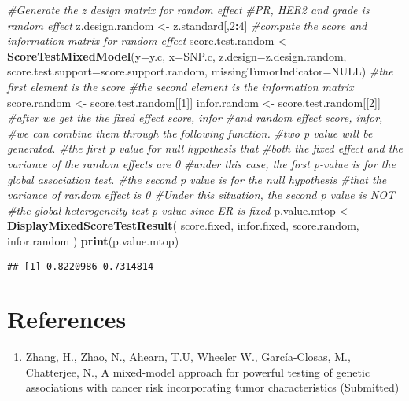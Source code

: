 \documentclass[11pt,]{article}
\newenvironment{Shaded}{\begin{snugshade}}{\end{snugshade}}
\newcommand{\KeywordTok}[1]{\textcolor[rgb]{0.13,0.29,0.53}{\textbf{#1}}}
\newcommand{\DataTypeTok}[1]{\textcolor[rgb]{0.13,0.29,0.53}{#1}}
\newcommand{\DecValTok}[1]{\textcolor[rgb]{0.00,0.00,0.81}{#1}}
\newcommand{\StringTok}[1]{\textcolor[rgb]{0.31,0.60,0.02}{#1}}
\newcommand{\CommentTok}[1]{\textcolor[rgb]{0.56,0.35,0.01}{\textit{#1}}}
\newcommand{\OtherTok}[1]{\textcolor[rgb]{0.56,0.35,0.01}{#1}}
\newcommand{\OperatorTok}[1]{\textcolor[rgb]{0.81,0.36,0.00}{\textbf{#1}}}
\newcommand{\NormalTok}[1]{#1}
\providecommand{\tightlist}{%
\setlength{\itemsep}{0pt}\setlength{\parskip}{0pt}}
\begin{document}
\begin{Shaded}
\begin{Highlighting}[]
\CommentTok{#Generate the z design matrix for random effect}
\CommentTok{#PR, HER2 and grade is random effect}
\NormalTok{z.design.random <-}\StringTok{ }\NormalTok{z.standard[,}\DecValTok{2}\OperatorTok{:}\DecValTok{4}\NormalTok{]}
\CommentTok{#compute the score and information matrix for random effect}
\NormalTok{score.test.random <-}\StringTok{ }\KeywordTok{ScoreTestMixedModel}\NormalTok{(}\DataTypeTok{y=}\NormalTok{y.c,}
                                         \DataTypeTok{x=}\NormalTok{SNP.c,}
                                         \DataTypeTok{z.design=}\NormalTok{z.design.random,}
                                         \DataTypeTok{score.test.support=}\NormalTok{score.support.random,}
                                         \DataTypeTok{missingTumorIndicator=}\OtherTok{NULL}\NormalTok{)}
\CommentTok{#the first element is the score}
\CommentTok{#the second element is the information matrix}
\NormalTok{score.random <-}\StringTok{ }\NormalTok{score.test.random[[}\DecValTok{1}\NormalTok{]]}
\NormalTok{infor.random <-}\StringTok{ }\NormalTok{score.test.random[[}\DecValTok{2}\NormalTok{]]}
\CommentTok{#after we get the the fixed effect score, infor }
\CommentTok{#and random effect score, infor, }
\CommentTok{#we can combine them through the following function. }
\CommentTok{#two p value will be generated.}
\CommentTok{#the first p value for null hypothesis that}
\CommentTok{#both the fixed effect and the variance of the random effects are 0}
\CommentTok{#under this case, the first p-value is for the global association test.}
\CommentTok{#the second p value is for the null hypothesis }
\CommentTok{#that the variance of random effect is 0}
\CommentTok{#Under this situation, the second p value is NOT }
\CommentTok{#the global heterogeneity test p value since ER is fixed}
\NormalTok{p.value.mtop <-}\StringTok{ }\KeywordTok{DisplayMixedScoreTestResult}\NormalTok{(}
\NormalTok{  score.fixed,}
\NormalTok{  infor.fixed,}
\NormalTok{  score.random,}
\NormalTok{  infor.random}
\NormalTok{)  }
\KeywordTok{print}\NormalTok{(p.value.mtop)}
\end{Highlighting}
\end{Shaded}

\begin{verbatim}
## [1] 0.8220986 0.7314814
\end{verbatim}

\section{References}\label{references}

\begin{enumerate}
\def\labelenumi{\arabic{enumi}.}
\tightlist
\item
  Zhang, H., Zhao, N., Ahearn, T.U, Wheeler W., García-Closas, M.,
  Chatterjee, N., A mixed-model approach for powerful testing of genetic
  associations with cancer risk incorporating tumor characteristics
  (Submitted)
\end{enumerate}




\newpage
\singlespacing 
\end{document}
